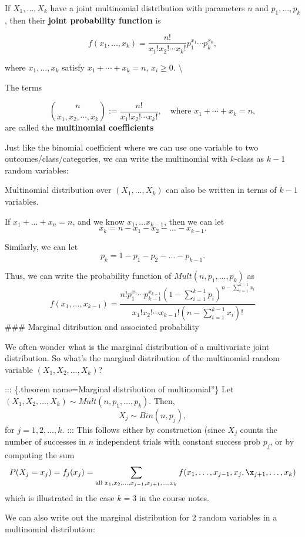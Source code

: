 \documentclass[
]{book}
\theoremstyle{definition}
\theoremstyle{definition}
\theoremstyle{definition}
\theoremstyle{definition}
\theoremstyle{remark}
\begin{document}
If \(X_1,...,X_k\) have a joint multinomial distribution with parameters \(n\) and \(p_1,...,p_k\), then their \textbf{joint probability function} is

\[
f(x_1,...,x_k) = \frac{n!}{x_1!x_2!\cdots x_k!} p_1^{x_1}\cdots p_k^{x_k},
\]

where \(x_1,...,x_k\) satisfy \(x_1+\cdots+x_k = n\), \(x_i \ge 0\). \textbackslash{}
\pause
\medskip

The terms

\[
\binom{n}{x_1, x_2, \cdots,x_k} := \frac{n!}{x_1!x_2!\cdots x_k!}, \quad\text{where } x_1+\cdots+x_k = n,
\]
are called the \textbf{multinomial coefficients}

Just like the binomial coefficient where we can use one variable to two outcomes/class/categories, we can write the multinomial with \(k\)-class as \(k-1\) random variables:

Multinomial distribution over \((X_1, \ldots, X_k)\) can also be written in terms of \(k-1\) variables.

If \(x_1 + \ldots + x_n = n\), and we know \(x_1, \ldots x_{k-1}\), then we can let
\[
x_k = n - x_1 - x_2 - \ldots - x_{k-1}.
\]

Similarly, we can let
\[
p_k = 1 - p_1 - p_2 - \ldots - p_{k-1}.
\]

Thus, we can write the probability function of \(Mult(n, p_1, \ldots, p_k)\) as
\[
f(x_1,...,x_{k-1}) = \frac{n! p_1^{x_1}\cdots p_{k-1}^{x_{k-1}} \left(1 - \sum_{i=1}^{k-1}p_i\right)^{n - \sum_{i=1}^{k-1} x_i}}{x_1!x_2!\cdots x_{k-1}! (n - \sum_{i=1}^{k-1} x_i)!}
\]
\#\#\# Marginal ditribution and associated probability

We often wonder what is the marginal distribution of a multivariate joint distribution. So what's the marginal distribution of the multinomial random variable \((X_1, X_2, \ldots, X_k)\)?

::: \{.theorem name=Marginal distribution of multinomial''\}
Let \((X_1, X_2, \ldots, X_k) \sim Mult(n, p_1, \ldots, p_k)\).
Then,
\[
        X_j \sim Bin(n, p_j),
        \]
for \(j = 1, 2, \ldots, k\).
:::
This follows either by construction (since \(X_j\) counts the number of successes in \(n\) independent trials with constant success prob \(p_j\), or by computing the sum
\[ P(X_j=x_j)=f_j(x_j)= \sum\limits_{\text{all }x_1,x_2,\dots,x_{j-1},x_{j+1},\dots,x_k} f(x_1,\dots,x_{j-1},x_j,\x_{j+1},\dots, x_k)\]
which is illustrated in the case \(k=3\) in the course notes.

We can also write out the marginal distribution for 2 random variables in a multinomial distribution:
\end{document}
